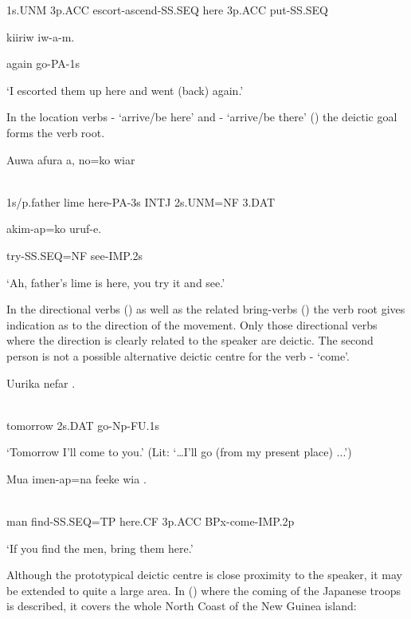 1s.UNM  3p.ACC  escort-ascend-SS.SEQ  here  3p.ACC  put-SS.SEQ

kiiriw  iw-a-m.

again  go-PA-1s

`I escorted them up here and went (back) again.'

In the location verbs - `arrive/be here' and - `arrive/be there' () the deictic goal forms the verb root. 

\ea%
\label{ex:x1275}
\gll Auwa  afura    a,  no=ko  wiar  \\
      \\
\glt
\z

1s/p.father  lime  here-PA-3s  INTJ  2s.UNM=NF  3.DAT

akim-ap=ko  uruf-e.

try-SS.SEQ=NF  see-IMP.2s

`Ah, father's lime is here, you try it and see.'

In the directional verbs () as well as the related bring-verbs () the verb root gives indication as to the direction of the movement. Only those directional verbs where the direction is clearly related to the speaker are deictic. The second person is not a possible alternative deictic centre for the verb - `come'.  

\ea%
\label{ex:x1278}
\gll Uurika  nefar  . \\
      \\
\glt
\z

tomorrow  2s.DAT  go-Np-FU.1s

`Tomorrow I'll come to you.' (Lit: `{\dots}I'll go (from my present place) ...')

\ea%
\label{ex:x1279}
\gll Mua  imen-ap=na  feeke  wia  . \\
      \\
\glt
\z

man  find-SS.SEQ=TP  here.CF  3p.ACC  BPx-come-IMP.2p

`If you find the men, bring them here.'

Although the prototypical deictic centre is close proximity to the speaker, it may be extended to quite a large area. In () where the coming of the Japanese troops is described, it covers the whole North Coast of the New Guinea island: 

